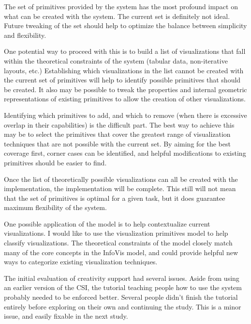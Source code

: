 \label{setPrimitivesFW}
The set of primitives provided by the system has the most profound impact on what can be created with the system.
The current set is definitely not ideal.
Future tweaking of the set should help to optimize the balance between simplicity and flexibility.

One potential way to proceed with this is to build a list of visualizations that fall within the theoretical constraints of the system (tabular data, non-iterative layouts, etc.)
Establishing which visualizations in the list cannot be created with the current set of primitives will help to identify possible primitives that should be created.
It also may be possible to tweak the properties and internal geometric representations of existing primitives to allow the creation of other visualizations.

Identifying which primitives to add, and which to remove (when there is excessive overlap in their capabilities) is the difficult part.
The best way to achieve this may be to select the primitives that cover the greatest range of visualization techniques that are not possible with the current set.
By aiming for the best coverage first, corner cases can be identified, and helpful modifications to existing primitives should be easier to find.

Once the list of theoretically possible visualizations can all be created with the implementation, the implementation will be complete.
This still will not mean that the set of primitives is optimal for a given task, but it does guarantee maximum flexibility of the system.

\label{contextualize}
One possible application of the model is to help contextualize current visualizations.
I would like to use the visualization primitives model to help classify visualizations.
The theoretical constraints of the model closely match many of the core concepts in the InfoVis model, and could provide helpful new ways to categorize existing visualization techniques.

\label{creativitySupportFW}
The initial evaluation of creativity support had several issues.
Aside from using an earlier version of the CSI, the tutorial teaching people how to use the system probably needed to be enforced better.
Several people didn't finish the tutorial entirely before exploring on their own and continuing the study.
This is a minor issue, and easily fixable in the next study.

